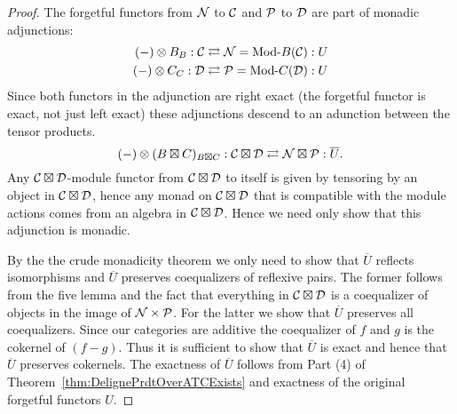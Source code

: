 \documentclass{amsart}
\begin{document}
\begin{proof}
	The forgetful functors from $\mathcal N$ to $\mathcal C$ and $\mathcal P$ to $\mathcal D$ are part of monadic adjunctions:
	\begin{align*}
		(-) \otimes B_{B}:\cC \rightleftarrows \cN = \Mod{}{B}(\cC): U \\
		(-) \otimes C_{C}:\cD \rightleftarrows \cP = \Mod{}{C}(\cD): U
	\end{align*}
	Since both functors in the adjunction are right exact (the forgetful functor is exact, not just left exact) these adjunctions descend to an adunction between the tensor products. 
	\begin{equation*}
		(-) \otimes (B \boxtimes C)_{B \boxtimes C}: \mathcal C \boxtimes \mathcal D \rightleftarrows \mathcal N \boxtimes \mathcal P: \overline{U}.
	\end{equation*}
	Any $\mathcal C \boxtimes \mathcal D$-module functor from $\mathcal C \boxtimes \mathcal D$ to itself is given by tensoring by an object in $\mathcal C \boxtimes \mathcal D$, hence any monad on $\mathcal C \boxtimes \mathcal D$ that is compatible with the module actions comes from an algebra in $\mathcal C \boxtimes \mathcal D$.  
	Hence we need only show that this adjunction is monadic.  
	
	
	By the the crude monadicity theorem \cite[\S~3.5]{MR771116} we only need to show that $\overline{U}$ reflects isomorphisms and $\overline{U}$ preserves coequalizers of reflexive pairs.  The former follows from the five lemma and the fact that everything in $\mathcal C \boxtimes \mathcal D $ is a coequalizer of objects in the image of $\mathcal N \times \mathcal P$.   
	For the latter we show that $\overline{U}$ preserves all coequalizers. Since our categories are additive the coequalizer of $f$ and $g$ is the cokernel of $(f-g)$.  Thus it is sufficient to show that $\overline{U}$ is exact and hence that $\overline{U}$ preserves cokernels.  The exactness of $\overline{U}$ follows from Part (4) of Theorem~\ref{thm:DelignePrdtOverATCExists} and exactness of the original forgetful functors $U$.  
\end{proof}




\end{document}

